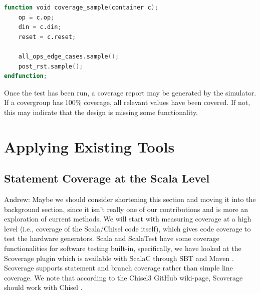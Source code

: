 \documentclass[conference]{IEEEtran}
\newcommand{\martin}[1]{{\color{blue} Martin: #1}}
\newcommand{\andrew}[1]{{\color{red} Andrew: #1}}
\begin{document}
\begin{lstlisting}[language=verilog]
function void coverage_sample(container c);
	op = c.op;
	din = c.din;
	reset = c.reset;
	
	all_ops_edge_cases.sample();
	post_rst.sample();
endfunction;
\end{lstlisting}

Once the test has been run, a coverage report may be generated by the simulator. If a covergroup has 100\% coverage, all relevant values have been covered. If not, this may indicate that the design is missing some functionality.



\section{Applying Existing Tools}

\subsection{Statement Coverage at the Scala Level}
\andrew{Maybe we should consider shortening this section and moving it into the background section, since it isn't really one of our contributions and is more an exploration of current methods.}
We will start with measuring coverage at a high level (i.e., coverage of the Scala/Chisel code itself), which gives code coverage to test the hardware generators. Scala and ScalaTest have some coverage functionalities for software testing built-in, specifically, we have looked at the Scoverage plugin which is available with ScalaC through SBT and Maven \cite{scoverage}. Scoverage supports statement and branch coverage rather than simple line coverage. We note that according to the Chisel3 GitHub wiki-page, Scoverage should work with Chisel \cite{chisel:scoverage}.

\end{document}
